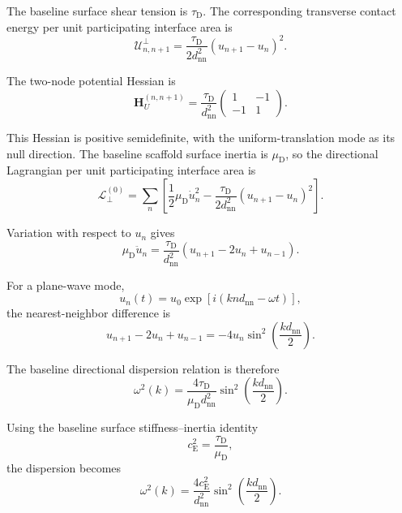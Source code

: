 The baseline surface shear tension is $\tau_{\mathrm{D}}$. The corresponding transverse contact energy per unit participating interface area is
\begin{equation}
    \mathcal{U}_{n,n+1}^{\perp} = \frac{\tau_{\mathrm{D}}}{2d_{\mathrm{nn}}^2} \left( u_{n+1}-u_n \right)^2.
\end{equation}

The two-node potential Hessian is
\begin{equation}
    \mathbf{H}_U^{(n,n+1)} = \frac{\tau_{\mathrm{D}}}{d_{\mathrm{nn}}^2}
    \begin{pmatrix}
        1 & -1 \\
        -1 & 1
    \end{pmatrix}.
\end{equation}

This Hessian is positive semidefinite, with the uniform-translation mode as its null direction. The baseline scaffold surface inertia is $\mu_{\mathrm{D}}$, so the directional Lagrangian per unit participating interface area is
\begin{equation}
    \mathcal{L}_{\perp}^{(0)} = \sum_n \left[ \frac{1}{2} \mu_{\mathrm{D}} \dot{u}_n^2 - \frac{\tau_{\mathrm{D}}}{2d_{\mathrm{nn}}^2} \left( u_{n+1}-u_n \right)^2 \right].
\end{equation}

Variation with respect to $u_n$ gives
\begin{equation}
    \mu_{\mathrm{D}} \ddot{u}_n = \frac{\tau_{\mathrm{D}}}{d_{\mathrm{nn}}^2} \left( u_{n+1} - 2u_n + u_{n-1} \right).
\end{equation}

For a plane-wave mode,
\begin{equation}
    u_n(t) = u_0 \exp \left[ i \left( knd_{\mathrm{nn}} - \omega t \right) \right],
\end{equation}
the nearest-neighbor difference is
\begin{equation}
    u_{n+1} - 2u_n + u_{n-1} = -4u_n \sin^2 \left( \frac{kd_{\mathrm{nn}}}{2} \right).
\end{equation}

The baseline directional dispersion relation is therefore
\begin{equation}
    \omega^2(k) = \frac{4\tau_{\mathrm{D}}}{\mu_{\mathrm{D}}d_{\mathrm{nn}}^2} \sin^2 \left( \frac{kd_{\mathrm{nn}}}{2} \right).
\end{equation}

Using the baseline surface stiffness--inertia identity
\begin{equation}
    c_{\mathrm{E}}^2 = \frac{\tau_{\mathrm{D}}}{\mu_{\mathrm{D}}},
\end{equation}
the dispersion becomes
\begin{equation}
    \omega^2(k) = \frac{4c_{\mathrm{E}}^2}{d_{\mathrm{nn}}^2} \sin^2 \left( \frac{kd_{\mathrm{nn}}}{2} \right).
\end{equation}

